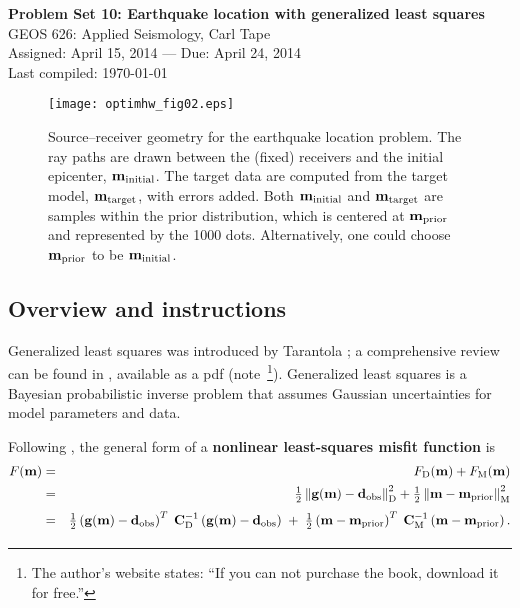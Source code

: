 \documentclass[11pt,titlepage,fleqn]{article}
\begin{document}

\begin{spacing}{1.2}
\begin{center}
{\large \bf Problem Set 10: Earthquake location with generalized least squares} \\
GEOS 626: Applied Seismology, Carl Tape \\
Assigned: April 15, 2014 --- Due: April 24, 2014 \\
Last compiled: \today
\end{center}
\end{spacing}


\vspace{1cm}
\begin{figure}[h]
\centering
\texttt{[image: optimhw\_fig02.eps]}
\caption[Source-receiver geometry]
{{
Source--receiver geometry for the earthquake location problem. The ray paths are drawn between the (fixed) receivers and the initial epicenter, $\mbox{${\bf m}$}_{\rm initial}$. The target data are computed from the target model, $\mbox{${\bf m}$}_{\rm target}$, with errors added. Both $\mbox{${\bf m}$}_{\rm initial}$ and $\mbox{${\bf m}$}_{\rm target}$ are samples within the prior distribution, which is centered at $\mbox{${\bf m}$}_{\rm prior}$ and represented by the 1000 dots. Alternatively, one could choose $\mbox{${\bf m}$}_{\rm prior}$ to be $\mbox{${\bf m}$}_{\rm initial}$.
\label{fig:srcrec}
}}
\end{figure}


\pagebreak
\subsection*{Overview and instructions}

Generalized least squares was introduced by Tarantola \citep{TarantolaValette1982quest,TarantolaValette1982nonlinear}; a comprehensive review can be found in \citet{Tarantola2005}, available as a pdf (note~\footnote{The author's website states: ``If you can not purchase the book, download it for free.''}). Generalized least squares is a Bayesian probabilistic inverse problem that assumes Gaussian uncertainties for model parameters and data.

Following \citet[][p.~205]{Tarantola2005}, the general form of a {\bf nonlinear least-squares misfit function} is
%
\begin{eqnarray}
\misfitvar(\bem) &=& \misfitvar_{\rm D}(\bem) + \misfitvar_{\rm M}(\bem) 
\nonumber \\
&=& \hlf \left\| \bg(\bem) - \bd_{\rm obs} \right\|^2_{\rm D} + \hlf \left\| \bem - \mprior \right\|^2_{\rm M}
\nonumber \\
&=& \hlf \left( \bg(\bem) - \bd_{\rm obs}\right)^T \; \covdi \left( \bg(\bem) - \bd_{\rm obs} \right)
\;+\; \hlf \left( \bem - \mprior \right)^T \; \covmi \left( \bem - \mprior \right).
\nonumber \\
\label{misfit_gen}
\end{eqnarray}
\end{document}
